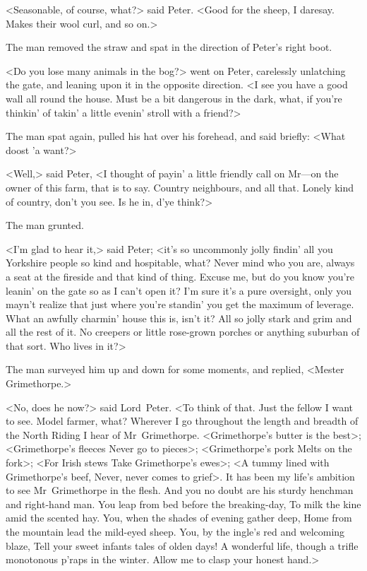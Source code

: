 <Seasonable, of course, what?> said Peter. <Good for the sheep, I daresay. Makes their wool curl, and so on.>

The man removed the straw and spat in the direction of Peter's right boot.

<Do you lose many animals in the bog?> went on Peter, carelessly unlatching the gate, and leaning upon it in the opposite direction. <I see you have a good wall all round the house. Must be a bit dangerous in the dark, what, if you're thinkin' of takin' a little evenin' stroll with a friend?>

The man spat again, pulled his hat over his forehead, and said briefly:
<What doost 'a want?>

<Well,> said Peter, <I thought of payin' a little friendly call on Mr—on the owner of this farm, that is to say. Country neighbours, and all that. Lonely kind of country, don't you see. Is he in, d'ye think?>

The man grunted.

<I'm glad to hear it,> said Peter; <it's so uncommonly jolly findin' all you Yorkshire people so kind and hospitable, what? Never mind who you are, always a seat at the fireside and that kind of thing. Excuse me, but do you know you're leanin' on the gate so as I can't open it?  I'm sure it's a pure oversight, only you mayn't realize that just where you're standin' you get the maximum of leverage. What an awfully charmin' house this is, isn't it? All so jolly stark and grim and all the rest of it. No creepers or little rose-grown porches or anything suburban of that sort. Who lives in it?>

The man surveyed him up and down for some moments, and replied, <Mester Grimethorpe.>

<No, does he now?> said Lord~Peter. <To think of that. Just the fellow I want to see. Model farmer, what? Wherever I go throughout the length and breadth of the North Riding I hear of Mr~Grimethorpe.  <Grimethorpe's butter is the best>; <Grimethorpe's fleeces Never go to pieces>; <Grimethorpe's pork Melts on the fork>; <For Irish stews Take Grimethorpe's ewes>; <A tummy lined with Grimethorpe's beef, Never, never comes to grief>. It has been my life's ambition to see Mr~Grimethorpe in the flesh. And you no doubt are his sturdy henchman and right-hand man. You leap from bed before the breaking-day, To milk the kine amid the scented hay. You, when the shades of evening gather deep, Home from the mountain lead the mild-eyed sheep. You, by the ingle's red and welcoming blaze, Tell your sweet infants tales of olden days! A wonderful life, though a trifle monotonous p'raps in the winter. Allow me to clasp your honest hand.>

